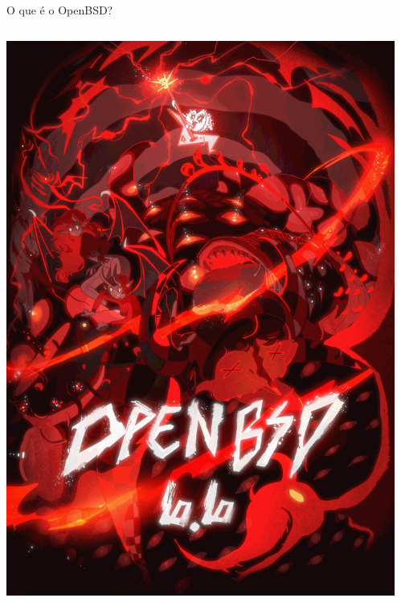 \documentclass[9pt,xcolor=table]{beamer}
\begin{document}
\begin{frame}{O que é o OpenBSD?}
\begin{columns}
\begin{column}{0.3\textwidth}
            \includegraphics[width=\textwidth]{imagens/banner-openbsd.png}
        \end{column}
        \begin{column}{0.3\textwidth}
            \centering

\end{column}
\end{columns}
\end{frame}
\end{document}
